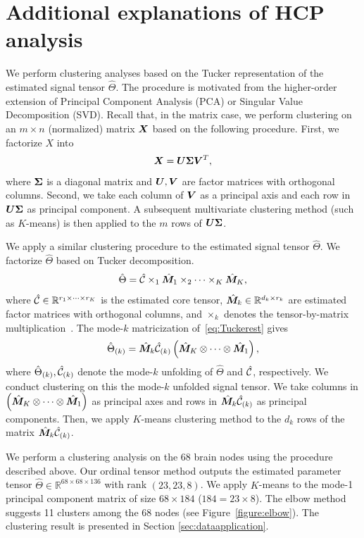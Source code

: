 \documentclass{article}
\theoremstyle{plain}
\theoremstyle{definition}
\begin{document}
\section{Additional explanations of HCP analysis}\label{sec:additionalHCP}
We perform clustering analyses based on the Tucker representation of the estimated signal tensor $\hat\Theta$. The procedure is motivated from the higher-order extension of Principal Component Analysis (PCA) or Singular Value Decomposition (SVD). Recall that, in the matrix case, we perform clustering on an $m\times n$ (normalized) matrix $\bm X$ based on the following procedure. First, we factorize $X$ into
\begin{equation}
\bm X = \bm{U}\bm \Sigma \bm{V}^T,
\end{equation}
where $\bm \Sigma$ is a diagonal matrix and $\bm{U},\bm{V}$ are factor matrices with orthogonal columns. Second, we take each column of $\bm{V}$ as a principal axis and each row in $\bm{U}\bm \Sigma$ as principal component. A subsequent multivariate clustering method (such as $K$-means) is then applied to the $m$ rows of $\bm{U}\bm \Sigma$.


We apply a similar clustering procedure to the estimated signal tensor $\hat\Theta$. We factorize $\hat \Theta$ based on Tucker decomposition.
\begin{equation}\label{eq:Tuckerest}
\hat \Theta = \hat {\mathcal{C}}\times_1\hat {\bm M}_1\times_2\cdots\times_K\hat {\bm M}_K,
\end{equation}
where $\hat {\mathcal{C}}\in\mathbb{R}^{r_1\times \cdots \times r_K}$ is the estimated core tensor, $\hat {\bm M}_k\in\mathbb{R}^{d_k\times r_k}$ are estimated factor matrices with orthogonal columns, and $\times_k$ denotes the tensor-by-matrix multiplication~\citep{kolda2009tensor}. The mode-$k$ matricization of~\eqref{eq:Tuckerest} gives
\begin{equation}
\hat \Theta_{(k)} = \hat {\bm M}_k\hat {\mathcal{C}}_{(k)}\left(\hat {\bm M}_K\otimes\cdots\otimes\hat {\bm M}_1\right),
\end{equation}
where $\hat \Theta_{(k)} , \hat {\mathcal{C}}_{(k)}$ denote the mode-$k$ unfolding of $\hat \Theta$ and $\hat {\mathcal{C}}$, respectively. We conduct clustering on this  the mode-$k$ unfolded signal tensor. We take columns in $\left(\hat {\bm M}_K\otimes\cdots\otimes\hat {\bm M}_1\right)$ as principal axes and rows in $\hat {\bm M}_k\hat {\mathcal{C}}_{(k)}$ as principal components. Then, we apply $K$-means clustering method to the $d_k$ rows of the matrix $\hat {\bm M}_k\hat {\mathcal{C}}_{(k)}$.

We perform a clustering analysis on the 68 brain nodes using the procedure described above. Our ordinal tensor method outputs the estimated parameter tensor $\hat\Theta\in\mathbb{R}^{68\times 68\times136}$ with rank $(23,23,8)$. We apply $K$-means to the mode-1 principal component matrix of size $68\times 184$ ($184=23\times8$). The elbow method suggests 11 clusters among the 68 nodes (see Figure~\ref{figure:elbow}).
The clustering result is presented in Section \ref{sec:dataapplication}.
\end{document}
